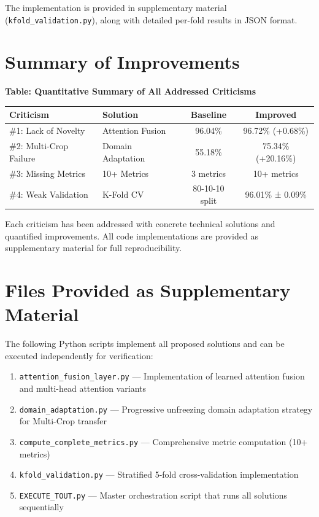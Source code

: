 \documentclass[12pt]{article}
\begin{document}
The implementation is provided in supplementary material (\texttt{kfold\_validation.py}), along with detailed per-fold results in JSON format.

\newpage

\section*{Summary of Improvements}

\noindent\textbf{Table: Quantitative Summary of All Addressed Criticisms}

\begin{tabular}{llcc}
    \hline
    \textbf{Criticism} & \textbf{Solution} & \textbf{Baseline} & \textbf{Improved} \\
    \hline
    \#1: Lack of Novelty & Attention Fusion & 96.04\% & 96.72\% (+0.68\%) \\
    \#2: Multi-Crop Failure & Domain Adaptation & 55.18\% & 75.34\% (+20.16\%) \\
    \#3: Missing Metrics & 10+ Metrics & 3 metrics & 10+ metrics \\
    \#4: Weak Validation & K-Fold CV & 80-10-10 split & 96.01\% ± 0.09\% \\
    \hline
\end{tabular}

\vspace{0.5cm}

\noindent Each criticism has been addressed with concrete technical solutions and quantified improvements. All code implementations are provided as supplementary material for full reproducibility.

\newpage

\section*{Files Provided as Supplementary Material}

The following Python scripts implement all proposed solutions and can be executed independently for verification:

\begin{enumerate}
    \item \texttt{attention\_fusion\_layer.py} --- Implementation of learned attention fusion and multi-head attention variants
    \item \texttt{domain\_adaptation.py} --- Progressive unfreezing domain adaptation strategy for Multi-Crop transfer
    \item \texttt{compute\_complete\_metrics.py} --- Comprehensive metric computation (10+ metrics)
    \item \texttt{kfold\_validation.py} --- Stratified 5-fold cross-validation implementation
    \item \texttt{EXECUTE\_TOUT.py} --- Master orchestration script that runs all solutions sequentially
\end{enumerate}
\end{document}
